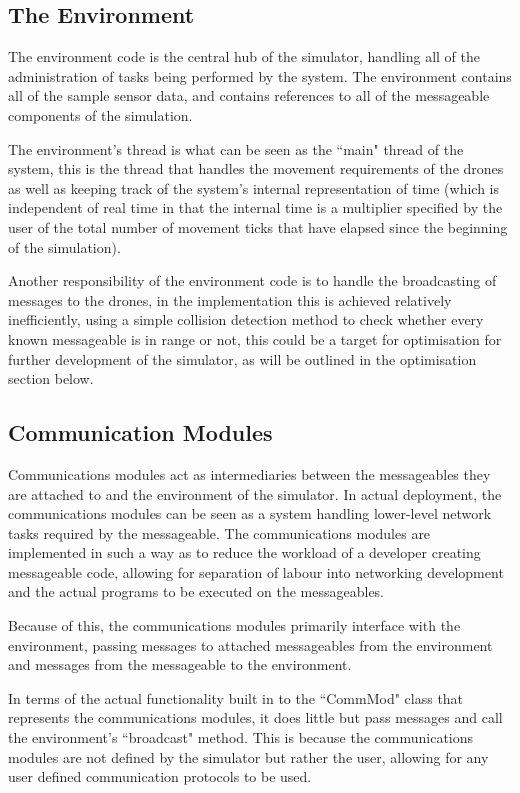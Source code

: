 	\subsection{The Environment}
		The environment code is the central hub of the simulator, handling all of the administration
		of tasks being performed by the system. The environment contains all of the sample sensor
		data, and contains references to all of the messageable components of the simulation.

		The environment's thread is what can be seen as the ``main" thread of the system, this is the
		thread that handles the movement requirements of the drones as well as keeping track of the
		system's internal representation of time (which is independent of real time in that
		the internal time is a multiplier specified by the user of the total number of movement ticks
		that have elapsed since the beginning of the simulation).

		Another responsibility of the environment code is to handle the broadcasting of messages to
		the drones, in the implementation this is achieved relatively inefficiently, using a simple collision detection
		method to check whether every known messageable is in range or not, this could be a target
		for optimisation for further development of the simulator, as will be outlined in the optimisation
		section below.

	\subsection{Communication Modules}
		Communications modules act as intermediaries between the messageables they are attached to and
		the environment of the simulator. In actual deployment, the communications modules can be seen as a system
		handling lower-level network tasks required by the messageable. The communications modules are implemented
		in such a way as to reduce the workload of a developer creating messageable code, allowing for separation
		of labour into networking development and the actual programs to be executed on the messageables.

		Because of this, the communications modules primarily interface with the environment, passing messages
		to attached messageables from the environment and messages from the messageable to the environment.

		In terms of the actual functionality built in to the ``CommMod" class that represents the communications
		modules, it does little but pass messages and call the environment's ``broadcast" method. This is because
		the communications modules are not defined by the simulator but rather the user, allowing for any user defined
		communication protocols to be used.

